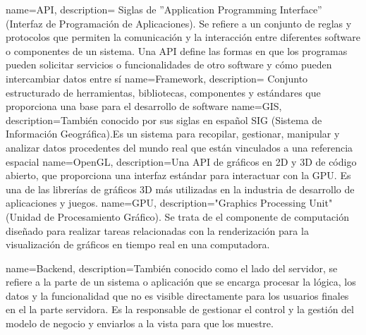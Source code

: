 \documentclass[a4paper, 11pt]{book}
\begin{document}
{
    name=API,
    description={
    Siglas de ''Application Programming Interface'' (Interfaz de Programación de Aplicaciones). Se refiere a un conjunto de reglas y protocolos que permiten la comunicación y la interacción entre diferentes software o componentes de un sistema. Una API define las formas en que los programas pueden solicitar servicios o funcionalidades de otro software y cómo pueden intercambiar datos entre sí
    }
}
{
    name=Framework,
    description={
    Conjunto estructurado de herramientas, bibliotecas, componentes y estándares que proporciona una base para el desarrollo de software
    }
}
{
    name=GIS,
    description={También conocido por sus siglas en español SIG (Sistema de Información Geográfica).Es un sistema para recopilar, gestionar, manipular y analizar datos procedentes del mundo real que están vinculados a una referencia espacial}
}
{
    name=OpenGL,
    description={Una API de gráficos en 2D y 3D de código abierto, que proporciona una interfaz estándar para interactuar con la GPU. Es una de las librerías de gráficos 3D más utilizadas en la industria de desarrollo de aplicaciones y juegos.}
}
{
    name=GPU,
    description={"Graphics Processing Unit" (Unidad de Procesamiento Gráfico). Se trata de el componente de computación diseñado para realizar tareas relacionadas con la renderización para la visualización de gráficos en tiempo real en una computadora.}
}

{
    name=Backend,
    description={También conocido como el lado del servidor, se refiere a la parte de un sistema o aplicación que se encarga procesar la lógica, los datos y la funcionalidad que no es visible directamente para los usuarios finales en el la parte servidora. Es la responsable de gestionar el control y la gestión del modelo de negocio y enviarlos a la vista para que los muestre.}
}
\printglossaries
\end{document}
